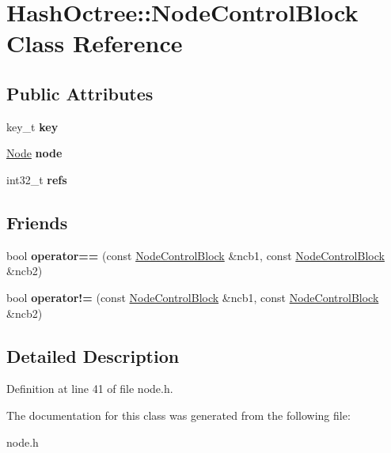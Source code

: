 \hypertarget{class_hash_octree_1_1_node_control_block}{}\section{Hash\+Octree\+::Node\+Control\+Block Class Reference}
\label{class_hash_octree_1_1_node_control_block}
\subsection*{Public Attributes}
\begin{DoxyCompactItemize}
\item 
\mbox{\label{class_hash_octree_1_1_node_control_block_a672e42c926a52f257d172201e6862e6d}} 
key\+\_\+t {\bfseries key}
\item 
\mbox{\label{class_hash_octree_1_1_node_control_block_a7d4e7be614eeadbbcd76f8b2a825b53c}} 
\mbox{\hyperlink{class_hash_octree_1_1_node}{Node}} {\bfseries node}
\item 
\mbox{\label{class_hash_octree_1_1_node_control_block_afac8e319ef3207191af4a531f00f9e91}} 
int32\+\_\+t {\bfseries refs}
\end{DoxyCompactItemize}
\subsection*{Friends}
\begin{DoxyCompactItemize}
\item 
\mbox{\label{class_hash_octree_1_1_node_control_block_ac028e64e0dde0367c933bb709bb87ec3}} 
bool {\bfseries operator==} (const \mbox{\hyperlink{class_hash_octree_1_1_node_control_block}{Node\+Control\+Block}} \&ncb1, const \mbox{\hyperlink{class_hash_octree_1_1_node_control_block}{Node\+Control\+Block}} \&ncb2)
\item 
\mbox{\label{class_hash_octree_1_1_node_control_block_aa2338796b0390932a5ba5f779dc58742}} 
bool {\bfseries operator!=} (const \mbox{\hyperlink{class_hash_octree_1_1_node_control_block}{Node\+Control\+Block}} \&ncb1, const \mbox{\hyperlink{class_hash_octree_1_1_node_control_block}{Node\+Control\+Block}} \&ncb2)
\end{DoxyCompactItemize}


\subsection{Detailed Description}


Definition at line 41 of file node.\+h.



The documentation for this class was generated from the following file\+:\begin{DoxyCompactItemize}
\item 
node.\+h\end{DoxyCompactItemize}
